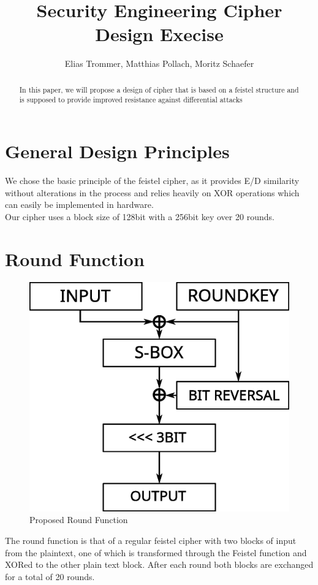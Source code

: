 \documentclass[a4paper]{article}
\begin{document}
    \title{Security Engineering Cipher Design Execise}
    \author{Elias Trommer, Matthias Pollach, Moritz Schaefer}
    \maketitle
    \begin{abstract}
	In this paper, we will propose a design of cipher that is based on a feistel structure and is supposed to provide improved resistance against differential attacks
    \end{abstract}
    \tableofcontents
    \section{General Design Principles}
    We chose the basic principle of the feistel cipher, as it provides E/D similarity without alterations in the process and relies heavily on XOR operations which can easily be implemented in hardware.\\[0.5em]
    Our cipher uses a block size of 128bit with a 256bit key over 20 rounds. 
    \section{Round Function}
    \begin{figure}[t]
	\centering
	\includegraphics[scale = .4]{roundfun.eps}
	\caption{Proposed Round Function}
	\label{fig:roundfun}
    \end{figure}
	The round function is that of a regular feistel cipher with two blocks of input from the plaintext, one of which is transformed through the Feistel function and XORed to the other plain text block. After each round both blocks are exchanged for a total of 20 rounds.
\end{document}

